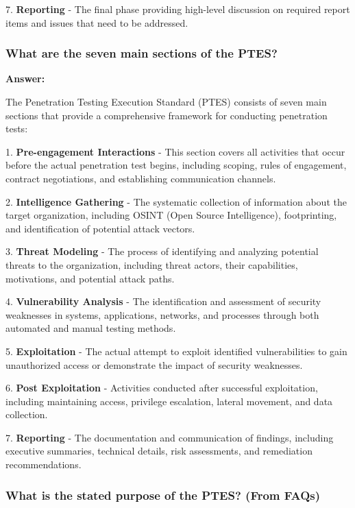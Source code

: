\documentclass[12pt,a4paper]{article}
\begin{document}
7. \textbf{Reporting} - The final phase providing high-level discussion on required report items and issues that need to be addressed. 

\subsubsection{What are the seven main sections of the PTES?}

\textbf{Answer:}

The Penetration Testing Execution Standard (PTES) consists of seven main sections that provide a comprehensive framework for conducting penetration tests:

1. \textbf{Pre-engagement Interactions} - This section covers all activities that occur before the actual penetration test begins, including scoping, rules of engagement, contract negotiations, and establishing communication channels.

2. \textbf{Intelligence Gathering} - The systematic collection of information about the target organization, including OSINT (Open Source Intelligence), footprinting, and identification of potential attack vectors.

3. \textbf{Threat Modeling} - The process of identifying and analyzing potential threats to the organization, including threat actors, their capabilities, motivations, and potential attack paths.

4. \textbf{Vulnerability Analysis} - The identification and assessment of security weaknesses in systems, applications, networks, and processes through both automated and manual testing methods.

5. \textbf{Exploitation} - The actual attempt to exploit identified vulnerabilities to gain unauthorized access or demonstrate the impact of security weaknesses.

6. \textbf{Post Exploitation} - Activities conducted after successful exploitation, including maintaining access, privilege escalation, lateral movement, and data collection.

7. \textbf{Reporting} - The documentation and communication of findings, including executive summaries, technical details, risk assessments, and remediation recommendations.

\subsubsection{What is the stated purpose of the PTES? (From FAQs)}
\end{document}
